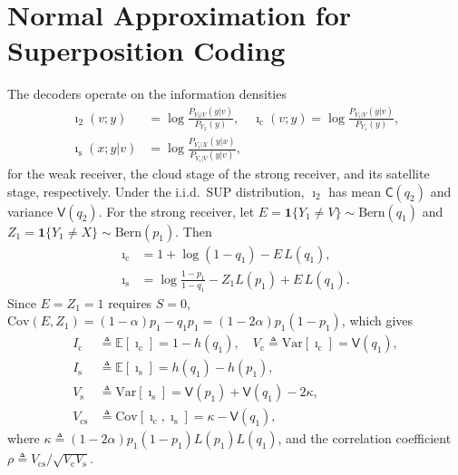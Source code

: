 \documentclass[conference]{IEEEtran}
\newcommand{\Vsf}{\mathsf{V}}
\newcommand{\Csf}{\mathsf{C}}
\newcommand{\Bern}{\mathrm{Bern}}
\begin{document}
\section{Normal Approximation for Superposition Coding}
\label{sec:na}
The decoders operate on the information densities
\begin{align}
\imath_2(v;y)&=\log\frac{P_{Y_2|V}(y|v)}{P_{Y_2}(y)},\quad
\imath_{\mathrm c}(v;y)=\log\frac{P_{Y_1|V}(y|v)}{P_{Y_1}(y)},\nonumber\\
\imath_{\mathrm s}(x;y|v)&=\log\frac{P_{Y_1|X}(y|x)}{P_{Y_1|V}(y|v)},
\end{align}
for the weak receiver, the cloud stage of the strong receiver, and its satellite stage, respectively. Under the i.i.d.\ SUP distribution, $\imath_2$ has mean $\Csf(q_2)$ and variance $\Vsf(q_2)$. For the strong receiver, let $E=\mathbf{1}\{Y_1\neq V\}\sim\Bern(q_1)$ and $Z_1=\mathbf{1}\{Y_1\neq X\}\sim\Bern(p_1)$. Then
\begin{align}
\imath_{\mathrm c}&=1+\log(1-q_1)-E\,L(q_1),\nonumber\\
\imath_{\mathrm s}&=\log\tfrac{1-p_1}{1-q_1}-Z_1L(p_1)+E\,L(q_1).
\end{align}
Since $E=Z_1=1$ requires $S=0$, $\mathrm{Cov}(E,Z_1)=(1-\alpha)p_1-q_1p_1=(1-2\alpha)p_1(1-p_1)$, which gives
\begin{align}
I_{\mathrm c}&\triangleq\mathbb{E}[\imath_{\mathrm c}]=1-h(q_1),\quad
V_{\mathrm c}\triangleq\mathrm{Var}[\imath_{\mathrm c}]=\Vsf(q_1),\nonumber\\
I_{\mathrm s}&\triangleq\mathbb{E}[\imath_{\mathrm s}]=h(q_1)-h(p_1),\nonumber\\
V_{\mathrm s}&\triangleq\mathrm{Var}[\imath_{\mathrm s}]=\Vsf(p_1)+\Vsf(q_1)-2\kappa,\nonumber\\
V_{\mathrm{cs}}&\triangleq\mathrm{Cov}[\imath_{\mathrm c},\imath_{\mathrm s}]=\kappa-\Vsf(q_1),
\label{eq:moments}
\end{align}
where $\kappa\triangleq(1-2\alpha)p_1(1-p_1)L(p_1)L(q_1)$, and the correlation coefficient $\rho\triangleq V_{\mathrm{cs}}/\sqrt{V_{\mathrm c}V_{\mathrm s}}$.
\end{document}
